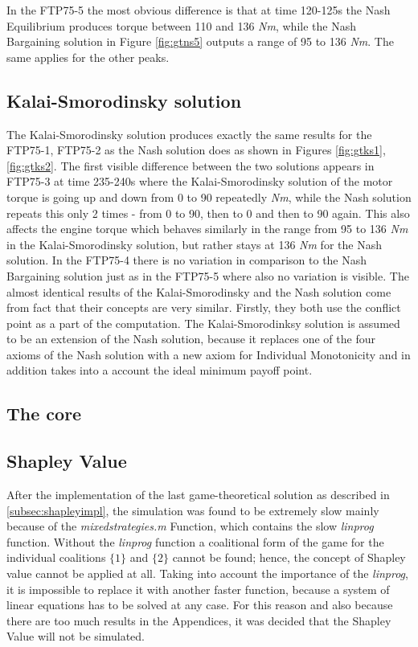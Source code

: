 In the FTP75-5 the most obvious difference is that at time 120-125s the Nash Equilibrium produces torque between 110 and 136 \textit{Nm}, while the Nash Bargaining solution in Figure \ref{fig:gtns5} outputs a range of 95 to 136 \textit{Nm}. The same applies for the other peaks.

\subsection{Kalai-Smorodinsky solution}
The Kalai-Smorodinsky solution produces exactly the same results for the FTP75-1, FTP75-2 as the Nash solution does as shown in Figures \ref{fig:gtks1}, \ref{fig:gtks2}. The first visible difference between the two solutions appears in FTP75-3 at time 235-240s where the Kalai-Smorodinsky solution of the motor torque is going up and down from 0 to 90 repeatedly \textit{Nm}, while the Nash solution repeats this only 2 times - from 0 to 90, then to 0 and then to 90 again. This also affects the engine torque which behaves similarly in the range from 95 to 136 \textit{Nm} in the Kalai-Smorodinsky solution, but rather stays at 136 \textit{Nm} for the Nash solution. In the FTP75-4 there is no variation in comparison to the Nash Bargaining solution just as in the FTP75-5 where also no variation is visible. The almost identical results of the Kalai-Smorodinsky and the Nash solution come from fact that their concepts are very similar. Firstly, they both use the conflict point as a part of the computation. The Kalai-Smorodinksy solution is assumed to be an extension of the Nash solution, because it replaces one of the four axioms of the Nash solution with a new axiom for Individual Monotonicity and in addition takes into a account the ideal minimum payoff point.

\subsection{The core}

\subsection{Shapley Value}
After the implementation of the last game-theoretical solution as described in \ref{subsec:shapleyimpl}, the simulation was found to be extremely slow mainly because of the \textit{mixedstrategies.m} Function, which contains the slow \textit{linprog} function. Without the \textit{linprog} function a coalitional form of the game for the individual coalitions $\{1\}$ and $\{2\}$ cannot be found; hence, the concept of Shapley value cannot be applied at all. Taking into account the importance of the \textit{linprog}, it is impossible to replace it with another faster function, because a system of linear equations has to be solved at any case. For this reason and also because there are too much results in the Appendices, it was decided that the Shapley Value will not be simulated.

